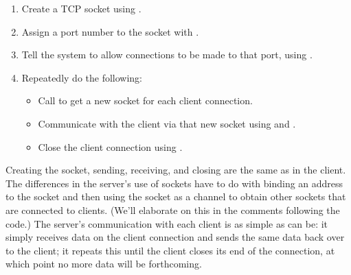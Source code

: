 \begin{enumerate}

\item Create a TCP socket using .

\item Assign a port number to the socket with .

\item Tell the system to allow connections to be made to that
port, using .

\item Repeatedly do the following:

\begin{itemize}

\item Call  to get a new socket for each client
connection.

\item Communicate with the client via that new socket
using  and .

\item Close the client connection using .

\end{itemize}

\end{enumerate}
Creating the socket, sending, receiving, and closing are the same as
in the client.  The differences  in the server's use of sockets
have to do with binding
an address to the socket and then using the socket as a channel to
obtain other sockets that are connected to clients.  (We'll elaborate
on this in the comments following the code.)
%
The server's communication with each client is as simple as can be: it simply
receives data on the client connection and sends the same data
back over to the client; it repeats this until the client closes its
end of the connection, at which point no more data will be forthcoming.


